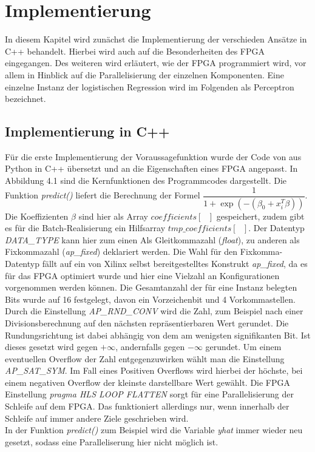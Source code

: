 \chapter{Implementierung}
In diesem Kapitel wird zunächst die Implementierung der verschieden Ansätze in C++ behandelt. Hierbei wird auch auf die Besonderheiten des FPGA eingegangen. Des weiteren wird erläutert, wie der FPGA programmiert wird, vor allem in Hinblick auf die Parallelisierung der einzelnen Komponenten. Eine einzelne Instanz der logistischen Regression wird im Folgenden als Perceptron bezeichnet.
\section{Implementierung in C++}
Für die erste Implementierung der Voraussagefunktion wurde der Code von \cite{IMPL} aus Python in C++ übersetzt und an die Eigenschaften eines FPGA angepasst. In Abbildung 4.1 sind die Kernfunktionen des Programmcodes dargestellt. Die Funktion \textit{predict()} liefert die Berechnung der Formel $\dfrac{1}{1+\exp(-(\beta_0+x_i^T\beta))}$. Die Koeffizienten $\beta$ sind hier als Array $coefficients[\text{ }]$ gespeichert, zudem gibt es für die Batch-Realisierung ein Hilfsarray $tmp\textit{\_}coefficients[\text{ }]$. Der Datentyp \textit{DATA\_TYPE} kann hier zum einen Als Gleitkommazahl (\textit{float}), zu anderen als Fixkommazahl (\textit{ap\_fixed}) deklariert werden. Die Wahl für den Fixkomma-Datentyp fällt auf ein von Xilinx selbst bereitgestelltes Konstrukt \textit{ap\_fixed}, da es für das FPGA optimiert wurde und hier eine Vielzahl an Konfigurationen vorgenommen werden können. Die Gesamtanzahl der für eine Instanz belegten Bits wurde auf 16 festgelegt, davon ein Vorzeichenbit und 4 Vorkommastellen. Durch die Einstellung \textit{AP\_RND\_CONV} wird die Zahl, zum Beispiel nach einer Divisionsberechnung auf den nächsten repräsentierbaren Wert gerundet. Die Rundungsrichtung ist dabei abhängig von dem am wenigsten signifikanten Bit. Ist dieses gesetzt wird gegen $+\infty$, andernfalls gegen $-\infty$ gerundet.\cite{XIL2}
Um einem eventuellen Overflow der Zahl entgegenzuwirken wählt man die Einstellung \textit{AP\_SAT\_SYM}. Im Fall eines Positiven Overflows wird hierbei der höchste, bei einem negativen Overflow der kleinste darstellbare Wert gewählt.\cite{XIL2} Die FPGA Einstellung \textit{pragma HLS LOOP FLATTEN} sorgt für eine Parallelisierung der Schleife auf dem FPGA. Das funktioniert allerdings nur, wenn innerhalb der Schleife auf immer andere Ziele geschrieben wird.\\ In der Funktion \textit{predict()} zum Beispiel wird die Variable \textit{yhat} immer wieder neu gesetzt, sodass eine Paralleliserung hier nicht möglich ist. 
